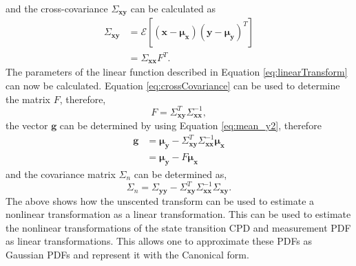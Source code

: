 \documentclass[12pt,oneside,openany,a4paper, %
afrikaans,english,
]{memoir}
\numberwithin{equation}{chapter}
\begin{document}
and the cross-covariance $\Sigma_{\bm{xy}}$ can be calculated as
\begin{equation}\label{eq:crossCovariance}
\begin{split}
\Sigma_{\bm{xy}} & = \mathcal{E}\left[(\bm{x} - \bm{\mu_x})(\bm{y} - \bm{\mu}_{\bm{y}})^T\right]\\
& = \Sigma_{\bm{xx}}F^T.
\end{split}
\end{equation}
The parameters of the linear function described in Equation \ref{eq:linearTransform} can now be calculated. Equation \ref{eq:crossCovariance} can be used to determine the matrix $F$, therefore,
\begin{equation}
F = \Sigma_{\bm{xy}}^T\Sigma_{\bm{xx}}^{-1},
\end{equation}\label{eq:detF}
the vector $\bm{g}$ can be determined by using Equation \ref{eq:mean_y2}, therefore
\begin{equation}\label{eq:detg}
\begin{split}
\bm{g} & = \bm{\mu_y} - \Sigma_{\bm{xy}}^T \Sigma_{\bm{xx}}^{-1} \bm{\mu_x}\\
& = \bm{\mu_y} - F\bm{\mu_x}
\end{split}
\end{equation}
and the covariance matrix $\Sigma_n$ can be determined as,
\begin{equation}\label{eq:detSigma_n}
\Sigma_n = \Sigma_{\bm{yy}} - \Sigma_{\bm{xy}}^T\Sigma_{\bm{xx}}^{-1}\Sigma_{\bm{xy}}.
\end{equation} 
The above shows how the unscented transform can be used to estimate a nonlinear transformation as a linear transformation. This can be used to estimate the nonlinear transformations of the state transition CPD and measurement PDF as linear transformations. This allows one to approximate these PDFs as Gaussian PDFs and represent it with the Canonical form.
\end{document}
